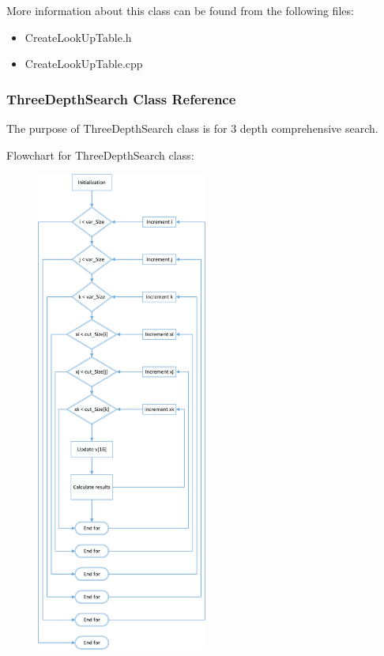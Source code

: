 \documentclass{article}
\begin{document}
More information about this class can be found from the following files:
\begin{itemize}
\item CreateLookUpTable.h
\item CreateLookUpTable.cpp
\end{itemize}

\subsubsection{ThreeDepthSearch Class Reference}
The purpose of ThreeDepthSearch class is for 3 depth comprehensive search.

Flowchart for ThreeDepthSearch class:
\begin{figure}[H]
\centering
\includegraphics[width=0.5\textwidth]{ThreeDepth.png}
\end{figure}
\end{document}
